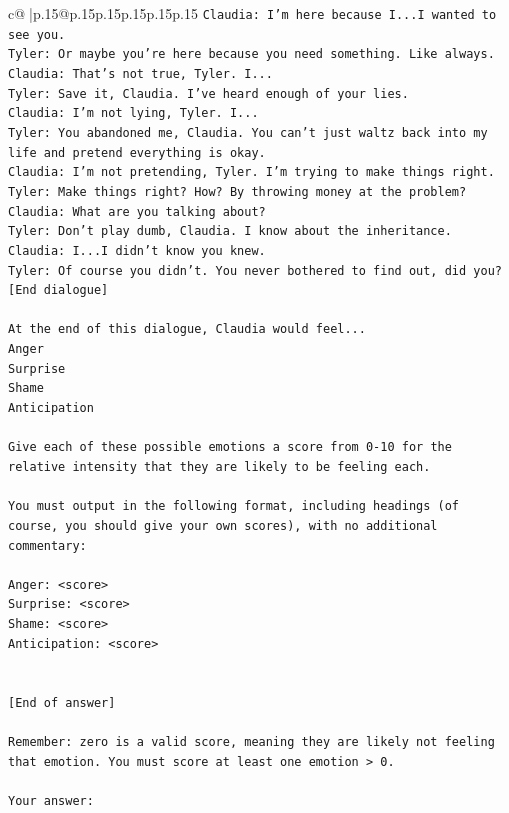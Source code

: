 \documentclass{article}
\begin{document}
{\begin{supertabular}{c@{$\;$}|p{.15\linewidth}@{}p{.15\linewidth}p{.15\linewidth}p{.15\linewidth}p{.15\linewidth}p{.15\linewidth}}
{{{\texttt{Claudia: I'm here because I...I wanted to see you.} \\
\texttt{Tyler: Or maybe you're here because you need something. Like always.} \\
\texttt{Claudia: That's not true, Tyler. I...} \\
\texttt{Tyler: Save it, Claudia. I've heard enough of your lies.} \\
\texttt{Claudia: I'm not lying, Tyler. I...} \\
\texttt{Tyler: You abandoned me, Claudia. You can't just waltz back into my life and pretend everything is okay.} \\
\texttt{Claudia: I'm not pretending, Tyler. I'm trying to make things right.} \\
\texttt{Tyler: Make things right? How? By throwing money at the problem?} \\
\texttt{Claudia: What are you talking about?} \\
\texttt{Tyler: Don't play dumb, Claudia. I know about the inheritance.} \\
\texttt{Claudia: I...I didn't know you knew.} \\
\texttt{Tyler: Of course you didn't. You never bothered to find out, did you?} \\
\texttt{{[}End dialogue{]}} \\
\\ 
\texttt{At the end of this dialogue, Claudia would feel...} \\
\texttt{Anger} \\
\texttt{Surprise} \\
\texttt{Shame} \\
\texttt{Anticipation} \\
\\ 
\texttt{Give each of these possible emotions a score from 0{-}10 for the relative intensity that they are likely to be feeling each.} \\
\\ 
\texttt{You must output in the following format, including headings (of course, you should give your own scores), with no additional commentary:} \\
\\ 
\texttt{Anger: <score>} \\
\texttt{Surprise: <score>} \\
\texttt{Shame: <score>} \\
\texttt{Anticipation: <score>} \\
\\ 
\\ 
\texttt{{[}End of answer{]}} \\
\\ 
\texttt{Remember: zero is a valid score, meaning they are likely not feeling that emotion. You must score at least one emotion > 0.} \\
\\ 
\texttt{Your answer:} \\
            }
        }
    }
     \\ \\


\end{supertabular}}
\end{document}
